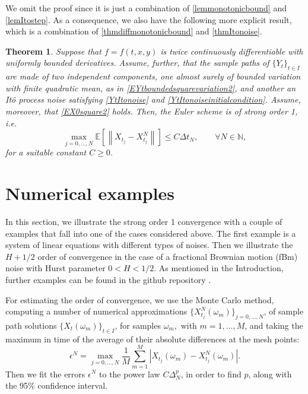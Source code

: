 \documentclass[reqno,12pt]{amsart}
\theoremstyle{plain} %
\newtheorem{theorem}{Theorem}[section]
\theoremstyle{definition} %
\begin{document}
We omit the proof since it is just a combination of \cref{lemmonotonicbound} and \cref{lemItostep}. As a consequence, we also have the following more explicit result, which is a combination of \cref{thmdiffmonotonicbound} and \cref{thmItonoise}.

\begin{theorem}
    \label{thmmixedcasepractical}
    Suppose that $f=f(t, x, y)$ is twice continuously differentiable with uniformly bounded derivatives. Assume, further, that the sample paths of $\{Y_t\}_{t\in I}$ are made of two independent components, one almost surely of bounded variation with finite quadratic mean, as in \eqref{EYtboundedsquarevariation2}, and another an It\^o process noise satisfying \eqref{YtItonoise} and \eqref{YtItonoiseinitialcondition}. Assume, moreover, that \eqref{EX0square2} holds. Then, the Euler scheme is of strong order 1, i.e.
    \begin{equation}
        \max_{j=0, \ldots, N}\mathbb{E}\left[ \left\| X_{t_j} - X_{t_j}^N \right\| \right] \leq C \Delta t_N, \qquad \forall N \in \mathbb{N},
    \end{equation}
    for a suitable constant $C \geq 0$.
\end{theorem}

\section{Numerical examples}
\label{secnumericalexamples}

In this section, we illustrate the strong order 1 convergence with a couple of examples that fall into one of the cases considered above. The first example is a system of linear equations with different types of noises. Then we illustrate the $H + 1/2$ order of convergence in the case of a fractional Brownian motion (fBm) noise with Hurst parameter $0 < H < 1/2$. As mentioned in the Introduction, further examples can be found in the github repository \cite{RODEConvEM2023}.

For estimating the order of convergence, we use the Monte Carlo method, computing a number of numerical approximations $\{X_{t_j}^N(\omega_m)\}_{j=0, \ldots, N}$, of sample path solutions $\{X_t(\omega_m)\}_{t\in I}$, for samples $\omega_m,$ with $m = 1, \ldots, M$, and taking the maximum in time of the average of their absolute differences at the mesh points:
\begin{equation}
    \epsilon^N = \max_{j=0, \ldots, N} \frac{1}{M}\sum_{m=1}^M \left|X_{t_j}(\omega_m) - X_{t_j}^N(\omega_m)\right|.
\end{equation}
Then we fit the errors $\epsilon^N$ to the power law $C\Delta_N^p$, in order to find $p$, along with the 95\% confidence interval.
\end{document}
